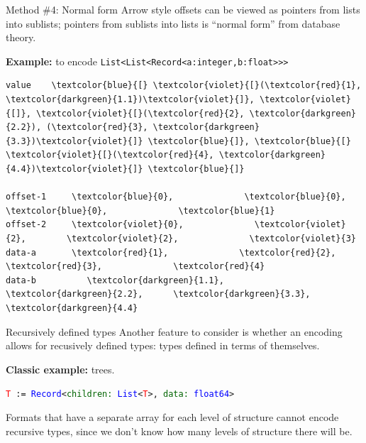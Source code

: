 \documentclass{beamer}
\begin{document}
\begin{frame}[fragile]{Method \#4: Normal form}
\vspace{0.5 cm}
Arrow style offsets can be viewed as pointers from lists into sublists; pointers from sublists into lists is ``normal form'' from database theory.

\vspace{0.35 cm}
{\bf Example:} to encode {\tt\footnotesize List<List<Record<a:integer,b:float>>>}

\scriptsize\bf
\begin{Verbatim}[commandchars=\\\{\}]
value    \textcolor{blue}{[} \textcolor{violet}{[}(\textcolor{red}{1}, \textcolor{darkgreen}{1.1})\textcolor{violet}{]}, \textcolor{violet}{[]}, \textcolor{violet}{[}(\textcolor{red}{2}, \textcolor{darkgreen}{2.2}), (\textcolor{red}{3}, \textcolor{darkgreen}{3.3})\textcolor{violet}{]} \textcolor{blue}{]}, \textcolor{blue}{[} \textcolor{violet}{[}(\textcolor{red}{4}, \textcolor{darkgreen}{4.4})\textcolor{violet}{]} \textcolor{blue}{]}

offset-1     \textcolor{blue}{0},              \textcolor{blue}{0},        \textcolor{blue}{0},              \textcolor{blue}{1}
offset-2     \textcolor{violet}{0},              \textcolor{violet}{2},        \textcolor{violet}{2},              \textcolor{violet}{3}
data-a       \textcolor{red}{1},              \textcolor{red}{2},        \textcolor{red}{3},              \textcolor{red}{4}
data-b          \textcolor{darkgreen}{1.1},            \textcolor{darkgreen}{2.2},      \textcolor{darkgreen}{3.3},            \textcolor{darkgreen}{4.4}
\end{Verbatim}

\vspace{0.35 cm}\normalsize\sf
{}

\vspace{0.35 cm}
\end{frame}

\begin{frame}{Recursively defined types}
\vspace{0.5 cm}
Another feature to consider is whether an encoding allows for recusively defined types: types defined in terms of themselves.

\vspace{0.5 cm}
{\bf Classic example:} trees.
\begin{center}
\tt\small \textcolor{red}{T} := \textcolor{blue}{Record}<\textcolor{darkgreen}{children:}\,\textcolor{blue}{List}<\textcolor{red}{T}>, \textcolor{darkgreen}{data:}\,\textcolor{blue}{float64}>
\end{center}

\vspace{0.5 cm}
Formats that have a separate array for each level of structure cannot encode recursive types, since we don't know how many levels of structure there will be.
\end{frame}
\end{document}
